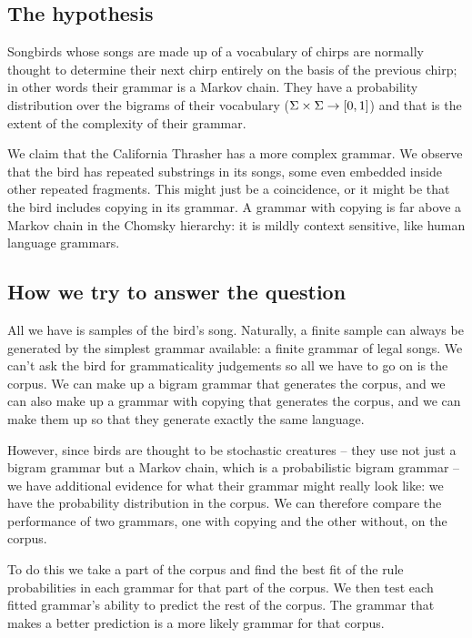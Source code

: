 \documentclass[12pt]{article}
\theoremstyle{definition}
\begin{document}
\subsection{The hypothesis}
\label{sec:hypothesis}


Songbirds whose songs are made up of a vocabulary of chirps are normally thought to determine their next chirp entirely on the basis of the previous chirp; in other words their grammar is a Markov chain. They have a probability distribution over the bigrams of their vocabulary ($\Sigma \times \Sigma \rightarrow [0,1]$) and that is the extent of the complexity of their grammar.

We claim that the California Thrasher has a more complex grammar. We observe that the bird has repeated substrings in its songs, some even embedded inside other repeated fragments. This might just be a coincidence, or it might be that the bird includes copying in its grammar.  A grammar with copying is far above a Markov chain in the Chomsky hierarchy: it is mildly context sensitive, like human language grammars. 

\subsection{How we try to answer the question}
\label{sec:how-we-try}

All we have is samples of the bird's song. Naturally, a finite sample can always be generated by the simplest grammar available: a finite grammar of legal songs. We can't ask the bird for grammaticality judgements so all we have to go on is the corpus. We can make up a bigram grammar that generates the corpus, and we can also make up a grammar with copying that generates the corpus, and we can make them up so that they generate exactly the same language.

However, since birds are thought to be stochastic creatures -- they use not just a bigram grammar but a Markov chain, which is a probabilistic bigram grammar -- we have additional evidence for what their grammar might really look like: we have the probability distribution in the corpus. We can therefore compare the performance of two grammars, one with copying and the other without, on the corpus. 

To do this we take a part of the corpus and find the best fit of the rule probabilities in each grammar for that part of the corpus. We then test each fitted grammar's ability to predict the rest of the corpus. The grammar that makes a better prediction is a more likely grammar for that corpus.
\end{document}
